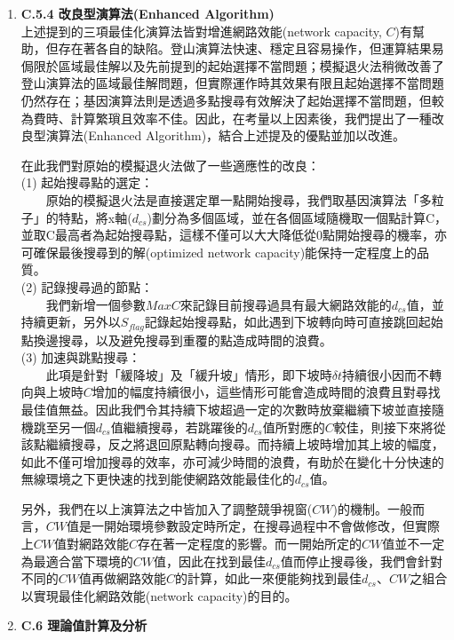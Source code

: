 \documentclass[12pt,a4paper]{article}
\begin{document}
\begin{description}
\begin{enumerate}
\item [\bf ]{\textbf{\Kai C.5.4 改良型演算法(Enhanced Algorithm) }}\\

上述提到的三項最佳化演算法皆對增進網路效能(network capacity, $C$)有幫助，但存在著各自的缺陷。登山演算法快速、穩定且容易操作，但運算結果易侷限於區域最佳解以及先前提到的起始選擇不當問題；模擬退火法稍微改善了登山演算法的區域最佳解問題，但實際運作時其效果有限且起始選擇不當問題仍然存在；基因演算法則是透過多點搜尋有效解決了起始選擇不當問題，但較為費時、計算繁瑣且效率不佳。因此，在考量以上因素後，我們提出了一種改良型演算法(Enhanced Algorithm)，結合上述提及的優點並加以改進。

在此我們對原始的模擬退火法做了一些適應性的改良：\\
(1) 起始搜尋點的選定：\\
　　原始的模擬退火法是直接選定單一點開始搜尋，我們取基因演算法「多粒子」的特點，將x軸($d_{cs}$)劃分為多個區域，並在各個區域隨機取一個點計算C，並取C最高者為起始搜尋點，這樣不僅可以大大降低從0點開始搜尋的機率，亦可確保最後搜尋到的解(optimized network capacity)能保持一定程度上的品質。\\
(2) 記錄搜尋過的節點：\\
　　我們新增一個參數$MaxC$來記錄目前搜尋過具有最大網路效能的$d_{cs}$值，並持續更新，另外以$S_{flag}$記錄起始搜尋點，如此遇到下坡轉向時可直接跳回起始點換邊搜尋，以及避免搜尋到重覆的點造成時間的浪費。\\
(3) 加速與跳點搜尋：\\
　　此項是針對「緩降坡」及「緩升坡」情形，即下坡時$\delta t$持續很小因而不轉向與上坡時$C$增加的幅度持續很小，這些情形可能會造成時間的浪費且對尋找最佳值無益。因此我們令其持續下坡超過一定的次數時放棄繼續下坡並直接隨機跳至另一個$d_{cs}$值繼續搜尋，若跳躍後的$d_{cs}$值所對應的$C$較佳，則接下來將從該點繼續搜尋，反之將退回原點轉向搜尋。而持續上坡時增加其上坡的幅度，如此不僅可增加搜尋的效率，亦可減少時間的浪費，有助於在變化十分快速的無線環境之下更快速的找到能使網路效能最佳化的$d_{cs}$值。

另外，我們在以上演算法之中皆加入了調整競爭視窗($CW$)的機制。一般而言，$CW$值是一開始環境參數設定時所定，在搜尋過程中不會做修改，但實際上$CW$值對網路效能$C$存在著一定程度的影響。而一開始所定的$CW$值並不一定為最適合當下環境的$CW$值，因此在找到最佳$d_{cs}$值而停止搜尋後，我們會針對不同的$CW$值再做網路效能$C$的計算，如此一來便能夠找到最佳$d_{cs}$、$CW$之組合以實現最佳化網路效能(network capacity)的目的。\\


\item [\bf ]{\textbf{\Kai C.6 理論值計算及分析 }}\\


\end{enumerate}
\end{description}
\end{document}
